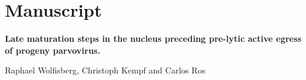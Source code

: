 \label{ChapterPub1}



\chapter{Manuscript}
\begin{center}
\vspace{5.5cm}

\LARGE{\textbf{Late maturation steps in the nucleus preceding pre-lytic active egress of
progeny parvovirus.}}

\vspace{3cm}

Raphael Wolfisberg, Christoph Kempf and Carlos Ros
\end{center}








\label{ChapterPub1End}

